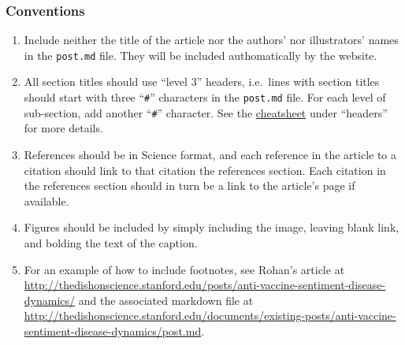\documentclass[paper=a4, fontsize=11pt]{scrartcl}
\numberwithin{equation}{section}        %
\numberwithin{figure}{section}            %
\numberwithin{table}{section}                %
\newcommand{\dishurlplain}[1]{http://thedishonscience.stanford.edu/#1}
\newcommand{\dishurl}[1]{\url{\dishurlplain{#1}}}
\begin{document}
\subsubsection{Conventions}\label{sec:conventions}
\begin{enumerate}
    \item Include neither the title of the article nor the authors' nor
        illustrators' names in the \texttt{post.md} file. They will be included
        authomatically by the website.
    \item All section titles should use ``level 3'' headers, i.e.\ lines with section
        titles should start with three ``\texttt{\#}'' characters in the
        \texttt{post.md} file. For each level of sub-section, add another
        ``\texttt{\#}'' character. See the
        \href{https://github.com/adam-p/markdown-here/wiki/Markdown-Cheatsheet}{cheatsheet}
        under ``headers'' for more details.
    \item References should be in Science format, and each reference in the
        article to a citation should link to that citation the references
        section. Each citation in the references section should in turn be a
        link to the article's page if available.
    \item Figures should be included by simply including the image, leaving
        blank link, and bolding the text of the caption.
    \item For an example of how to include footnotes, see Rohan's article at
        \dishurl{posts/anti-vaccine-sentiment-disease-dynamics/} and the
        associated markdown file at
        \dishurl{documents/existing-posts/anti-vaccine-sentiment-disease-dynamics/post.md}.

\end{enumerate}

\end{document}

